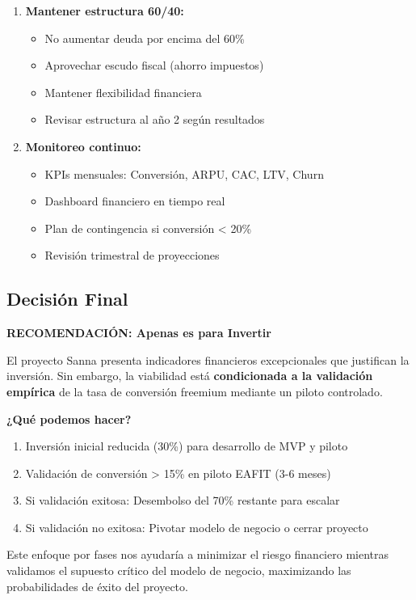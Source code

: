 \begin{enumerate}
    \item \textbf{Mantener estructura 60/40:}
    \begin{itemize}
        \item No aumentar deuda por encima del 60\%
        \item Aprovechar escudo fiscal (ahorro impuestos)
        \item Mantener flexibilidad financiera
        \item Revisar estructura al año 2 según resultados
    \end{itemize}
    
    \item \textbf{Monitoreo continuo:}
    \begin{itemize}
        \item KPIs mensuales: Conversión, ARPU, CAC, LTV, Churn
        \item Dashboard financiero en tiempo real
        \item Plan de contingencia si conversión < 20\%
        \item Revisión trimestral de proyecciones
    \end{itemize}
\end{enumerate}

\subsection{Decisión Final}

\textbf{RECOMENDACIÓN: Apenas es para Invertir}

El proyecto Sanna presenta indicadores financieros excepcionales que justifican la inversión. Sin embargo, la viabilidad está \textbf{condicionada a la validación empírica} de la tasa de conversión freemium mediante un piloto controlado.

\textbf{¿Qué podemos hacer?}
\begin{enumerate}
    \item Inversión inicial reducida (30\%) para desarrollo de MVP y piloto
    \item Validación de conversión > 15\% en piloto EAFIT (3-6 meses)
    \item Si validación exitosa: Desembolso del 70\% restante para escalar
    \item Si validación no exitosa: Pivotar modelo de negocio o cerrar proyecto
\end{enumerate}

Este enfoque por fases nos ayudaría a minimizar el riesgo financiero mientras validamos el supuesto crítico del modelo de negocio, maximizando las probabilidades de éxito del proyecto.
